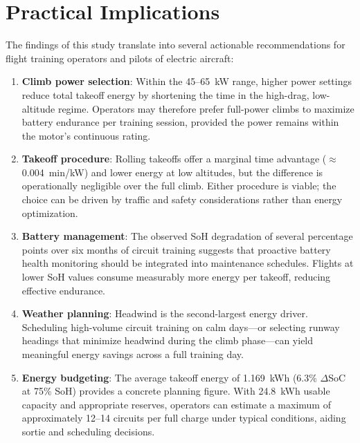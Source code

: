 \documentclass[11pt,a4paper]{article}
\begin{document}
\section{Practical Implications}

The findings of this study translate into several actionable recommendations for flight training operators and pilots of electric aircraft:

\begin{enumerate}
    \item \textbf{Climb power selection}: Within the 45--65~kW range, higher power settings reduce total takeoff energy by shortening the time in the high-drag, low-altitude regime. Operators may therefore prefer full-power climbs to maximize battery endurance per training session, provided the power remains within the motor's continuous rating.

    \item \textbf{Takeoff procedure}: Rolling takeoffs offer a marginal time advantage ($\approx$0.004~min/kW) and lower energy at low altitudes, but the difference is operationally negligible over the full climb. Either procedure is viable; the choice can be driven by traffic and safety considerations rather than energy optimization.

    \item \textbf{Battery management}: The observed SoH degradation of several percentage points over six months of circuit training suggests that proactive battery health monitoring should be integrated into maintenance schedules. Flights at lower SoH values consume measurably more energy per takeoff, reducing effective endurance.

    \item \textbf{Weather planning}: Headwind is the second-largest energy driver. Scheduling high-volume circuit training on calm days---or selecting runway headings that minimize headwind during the climb phase---can yield meaningful energy savings across a full training day.

    \item \textbf{Energy budgeting}: The average takeoff energy of 1.169~kWh (6.3\% $\Delta$SoC at 75\% SoH) provides a concrete planning figure. With 24.8~kWh usable capacity and appropriate reserves, operators can estimate a maximum of approximately 12--14 circuits per full charge under typical conditions, aiding sortie and scheduling decisions.
\end{enumerate}
\end{document}
